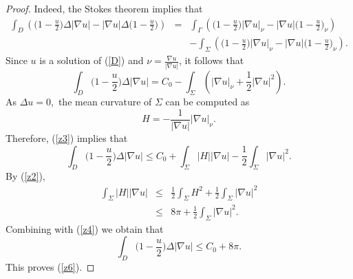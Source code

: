 \documentclass{amsart}
\numberwithin{equation}{section}
\begin{document}
\begin{proof}
Indeed, the Stokes theorem implies that 
\begin{eqnarray*}
\int_{D}\left( \big(1-\frac{u}{2}\big)\Delta \left\vert \nabla u\right\vert -\left\vert
\nabla u\right\vert \Delta \big(1-\frac{u}{2}\big)\right) &=&\int_{\Gamma
}\left(  \big(1-\frac{u}{2}\big)\left\vert \nabla u\right\vert _{\nu }-\left\vert \nabla
u\right\vert \big(1-\frac{u}{2}\big)_\nu\right)\\
&&-\int_{\Sigma
}\left( \big(1-\frac{u}{2}\big)\left\vert \nabla u\right\vert _{\nu }-\left\vert \nabla
u\right\vert \big(1-\frac{u}{2}\big)_\nu\right).
\end{eqnarray*}
Since $u$ is a solution of (\ref{D}) and $\nu =\frac{\nabla u}{\left\vert \nabla u\right\vert }$, it follows that 
\begin{equation} \label{z3}
\int_{D} \big(1-\frac{u}{2}\big)\Delta \left\vert \nabla u\right\vert =C_0-\int_{\Sigma
}\left( \left\vert \nabla u\right\vert _{\nu }+\frac{1}{2}\left\vert \nabla
u\right\vert^2\right).
\end{equation}
As $\Delta u=0,$ the mean curvature of $\Sigma $ can be computed as 
\begin{equation*}
H=-\frac{1}{\left\vert \nabla u\right\vert }\left\vert \nabla u\right\vert
_{\nu }.
\end{equation*}%
Therefore, (\ref{z3}) implies that 
\begin{equation}  \label{z4}
\int_{D} \big(1-\frac{u}{2}\big)\Delta \left\vert \nabla u\right\vert \leq C_0+\int_{\Sigma
}\left\vert H\right\vert \left\vert \nabla u\right\vert-\frac{1}{2}\int_\Sigma \left\vert \nabla
u\right\vert^2.
\end{equation}
  By (\ref{z2}), 
\begin{eqnarray*}
\int_{\Sigma }\left\vert H\right\vert \left\vert \nabla u\right\vert  &\leq &%
\frac{1}{2}\int_{\Sigma }H^{2}+\frac{1}{2}\int_{\Sigma }\left\vert \nabla
u\right\vert ^{2} \\
&\leq &8\pi +\frac{1}{2}\int_{\Sigma }\left\vert \nabla u\right\vert ^{2}.
\end{eqnarray*}%
Combining with (\ref{z4}) we obtain that   
\begin{equation*}
\int_{D}\big(1-\frac{u}{2}\big)\Delta \left\vert \nabla u\right\vert \leq C_0+8\pi. 
\end{equation*}
This proves (\ref{z6}). 


\end{proof}
\end{document}
